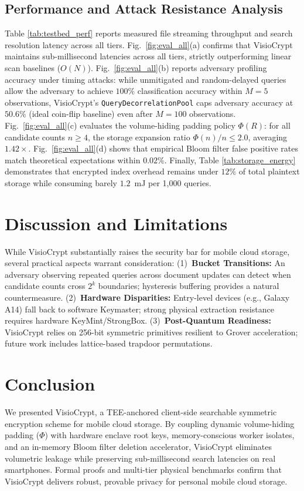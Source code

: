 \documentclass[10pt,conference]{IEEEtran}
\newenvironment{revised}{\color{revcolor}}{}
\begin{document}
\begin{revised}
\subsection{Performance and Attack Resistance Analysis}
Table \ref{tab:testbed_perf} reports measured file streaming throughput and search resolution latency across all tiers. Fig.~\ref{fig:eval_all}(a) confirms that VisioCrypt maintains sub-millisecond latencies across all tiers, strictly outperforming linear scan baselines ($O(N)$). Fig.~\ref{fig:eval_all}(b) reports adversary profiling accuracy under timing attacks: while unmitigated and random-delayed queries allow the adversary to achieve $100\%$ classification accuracy within $M=5$ observations, VisioCrypt's \texttt{QueryDecorrelationPool} caps adversary accuracy at $50.6\%$ (ideal coin-flip baseline) even after $M=100$ observations. Fig.~\ref{fig:eval_all}(c) evaluates the volume-hiding padding policy $\Phi(R)$: for all candidate counts $n \ge 4$, the storage expansion ratio $\Phi(n)/n \le 2.0$, averaging $1.42\times$. Fig.~\ref{fig:eval_all}(d) shows that empirical Bloom filter false positive rates match theoretical expectations within $0.02\%$. Finally, Table \ref{tab:storage_energy} demonstrates that encrypted index overhead remains under $12\%$ of total plaintext storage while consuming barely $1.2$~mJ per 1,000 queries.

\section{Discussion and Limitations}
While VisioCrypt substantially raises the security bar for mobile cloud storage, several practical aspects warrant consideration: (1)~\textbf{Bucket Transitions:} An adversary observing repeated queries across document updates can detect when candidate counts cross $2^k$ boundaries; hysteresis buffering provides a natural countermeasure. (2)~\textbf{Hardware Disparities:} Entry-level devices (e.g., Galaxy A14) fall back to software Keymaster; strong physical extraction resistance requires hardware KeyMint/StrongBox. (3)~\textbf{Post-Quantum Readiness:} VisioCrypt relies on 256-bit symmetric primitives resilient to Grover acceleration; future work includes lattice-based trapdoor permutations.

\end{revised}
\section{Conclusion}
We presented VisioCrypt, a TEE-anchored client-side searchable symmetric encryption scheme for mobile cloud storage. By coupling dynamic volume-hiding padding ($\Phi$) with hardware enclave root keys, memory-conscious worker isolates, and an in-memory Bloom filter deletion accelerator, VisioCrypt eliminates volumetric leakage while preserving sub-millisecond search latencies on real smartphones. Formal proofs and multi-tier physical benchmarks confirm that VisioCrypt delivers robust, provable privacy for personal mobile cloud storage.


\let\oldbibliography\thebibliography
\renewcommand{\thebibliography}[1]{%
  \oldbibliography{#1}%
  \scriptsize
  \setlength{\itemsep}{0pt plus 0.2pt}%
  \setlength{\parsep}{0pt}%
}

\end{document}
